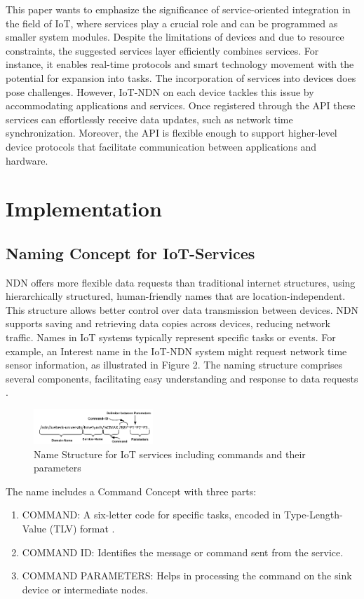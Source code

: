 \documentclass[10pt, twocolumn, journal]{IEEEtran}
\begin{document}
This paper wants to emphasize the significance of service-oriented integration in the field of IoT, where services play a crucial role and can be programmed as smaller system modules. Despite the limitations of devices and due to resource constraints, the suggested services layer efficiently combines services. For instance, it enables real-time protocols and smart technology movement with the potential for expansion into tasks. The incorporation of services into devices does pose challenges. However, IoT-NDN on each device tackles this issue by accommodating applications and services. Once registered through the API these services can effortlessly receive data updates, such as network time synchronization. Moreover, the API is flexible enough to support higher-level device protocols that facilitate communication between applications and hardware.

\section{Implementation}
\subsection{Naming Concept for IoT-Services}
NDN offers more flexible data requests than traditional internet structures, using hierarchically structured, human-friendly names that are location-independent. This structure allows better control over data transmission between devices. NDN supports saving and retrieving data copies across devices, reducing network traffic. Names in IoT systems typically represent specific tasks or events. For example, an Interest name in the IoT-NDN system might request network time sensor information, as illustrated in Figure 2. The naming structure comprises several components, facilitating easy understanding and response to data requests \cite{amadeo2014named}.

\begin{figure}[ht]
    \centering
    \includegraphics[width=0.4\textwidth]{figure_2.png}
    \caption{Name Structure for IoT services including commands and their parameters}
    \label{fig:figure_2}
  \end{figure}

The name includes a Command Concept with three parts: 
\begin{enumerate}[label=\arabic*.), leftmargin=1cm]
    \item COMMAND: A six-letter code for specific tasks, encoded in Type-Length-Value (TLV) format \cite{zhang2010named}.
    \item COMMAND ID: Identifies the message or command sent from the service.
    \item COMMAND PARAMETERS: Helps in processing the command on the sink device or intermediate nodes.
\end{enumerate}
\end{document}

